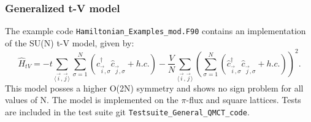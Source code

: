 
\subsubsection{Generalized t-V model}

The example code \texttt{Hamiltonian\_Examples\_mod.F90}   contains  an implementation of the SU(N)  t-V model, given by: 
\begin{equation}
	  \hat{H}_{tV} =   
	   -  t  \sum_{\langle \vec{i}, \vec{j} \rangle}   \sum_{\sigma =1}^{N} 
	  \left( \hat{c}^{\dagger}_{\vec{i},\sigma} \hat{c}^{\phantom{\dagger}}_{\vec{j},\sigma}    + h.c. \right)    -\frac{V}{N}  \sum_{\langle \vec{i}, \vec{j} \rangle} 
	   \left( \sum_{\sigma =1}^{N} 
	  \left( \hat{c}^{\dagger}_{\vec{i},\sigma} \hat{c}^{\phantom{\dagger}}_{\vec{j},\sigma}    + h.c. \right)  \right)^2. 
\end{equation}
This model  posses a higher O(2N) symmetry and shows no sign problem  for all values of N.   The model  is implemented on the $\pi$-flux and  square lattices. Tests are included in the test suite git \texttt{Testsuite\_General\_QMCT\_code}.


